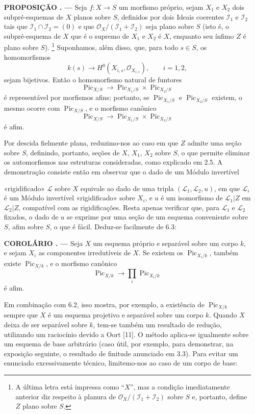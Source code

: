\documentclass[11pt,twoside,openany]{book}
\numberwithin{equation}{section}
\newcommand{\src}[1]{%
  \phantomsection\hypertarget{src:#1}{}%
  \marginpar{\raggedleft\footnotesize\sffamily #1}%
}
\theoremstyle{plain}
\theoremstyle{definition}
\theoremstyle{remark}
\newcommand{\result}[2]{%
  \par\medskip\noindent\textbf{#1%
  \if\relax\detokenize{#2}\relax\else\space#2\fi. ---}\enspace
}
\newcommand{\FgaUnitKey}{frontmatter}
\renewcommand{\src}[1]{%
  \phantomsection\hypertarget{src:\FgaUnitKey:#1}{}%
  \marginpar{\raggedleft\footnotesize\sffamily #1}%
}
\begin{document}
\result{PROPOSIÇÃO}{6.3} Seja $f:X\longrightarrow S$ um morfismo próprio, sejam
$X_1$ e $X_2$ dois subpré-esquemas de $X$ planos sobre $S$, definidos por dois
Ideais coerentes $\mathcal I_1$ e $\mathcal I_2$ tais que
$\mathcal I_1\cap\mathcal I_2=(0)$ e que
$\mathcal O_X/(\mathcal I_1+\mathcal I_2)$ seja plano sobre $S$ (isto é, o
subpré-esquema de $X$ que é o supremo de $X_1$ e $X_2$ é $X$, enquanto seu ínfimo $Z$
é plano sobre $S$).
\footnote{A última letra está impressa como ``$X$'', mas a condição
imediatamente anterior diz respeito à planura de
$\mathcal O_X/(\mathcal I_1+\mathcal I_2)$ sobre $S$ e, portanto, define $Z$
plano sobre $S$.} Suponhamos, além disso, que, para todo $s\in S$, os
homomorfismos
\[
k(s)\longrightarrow H^0(X_{i,s},\mathcal O_{X_{i,s}}),\qquad i=1,2,
\]
sejam bijetivos. Então o homomorfismo natural de funtores
\[
\operatorname{Pic}_{X/S}\longrightarrow
\operatorname{Pic}_{X_1/S}\times\operatorname{Pic}_{X_2/S}
\]
é representável por morfismos afins; portanto, se
$\operatorname{Pic}_{X_1/S}$ e $\operatorname{Pic}_{X_2/S}$ existem, o mesmo
ocorre com $\operatorname{Pic}_{X/S}$, e o morfismo canônico
\[
\operatorname{Pic}_{X/S}\longrightarrow
\operatorname{Pic}_{X_1/S}\times\operatorname{Pic}_{X_2/S}
\]
é afim.

Por descida fielmente plana, reduzimo-nos ao caso em que $Z$ admite uma seção
sobre $S$, definindo, portanto, seções de $X$, $X_1$, $X_2$ sobre $S$, o que
permite eliminar os automorfismos nas estruturas consideradas, como explicado
em 2.5. A demonstração consiste então em observar que o dado de um Módulo
invertível
\src{159}
«rigidificado» $\mathcal L$ sobre $X$ equivale ao dado de uma tripla
$(\mathcal L_1,\mathcal L_2,u)$, em que $\mathcal L_i$ é um Módulo invertível
«rigidificado» sobre $X_i$, e $u$ é um isomorfismo de
$\mathcal L_1|Z$ em $\mathcal L_2|Z$, compatível com as rigidificações.
Resta apenas verificar que, para $\mathcal L_1$ e $\mathcal L_2$ fixados, o
dado de $u$ se exprime por uma seção de um esquema conveniente sobre $S$, afim
sobre $S$, o que é fácil. Deduz-se facilmente de 6.3:

\result{COROLÁRIO}{6.4} Seja $X$ um esquema próprio e separável sobre um corpo
$k$, e sejam $X_i$ as componentes irredutíveis de $X$. Se existem os
$\operatorname{Pic}_{X_i/k}$, também existe $\operatorname{Pic}_{X/k}$, e o
morfismo canônico
\[
\operatorname{Pic}_{X/k}\longrightarrow\prod_i\operatorname{Pic}_{X_i/k}
\]
é afim.

Em combinação com 6.2, isso mostra, por exemplo, a existência de
$\operatorname{Pic}_{X/k}$ sempre que $X$ é um esquema projetivo e separável
sobre um corpo $k$. Quando $X$ deixa de ser separável sobre $k$, tem-se também
um resultado de redução, utilizando um raciocínio devido a Oort [11]. O método
aplica-se igualmente sobre um esquema de base arbitrário (caso útil, por
exemplo, para demonstrar, na exposição seguinte, o resultado de finitude
anunciado em 3.3). Para evitar um enunciado excessivamente técnico,
limitemo-nos ao caso de um corpo de base:
\end{document}
